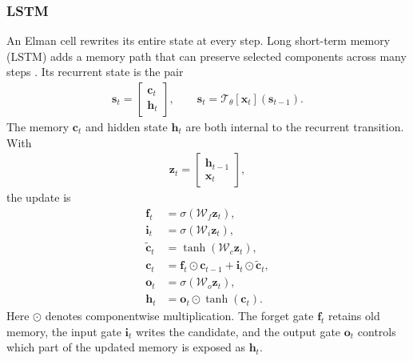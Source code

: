 \documentclass[11pt]{article}
\begin{document}
\subsubsection{LSTM}
An Elman cell rewrites its entire state at every step.  Long short-term memory
(LSTM) adds a memory path that can preserve selected components across many
steps \citep{hochreiter1997lstm}.  Its recurrent state is the pair
\begin{equation}
  \begin{split}
  \bm{s}_t=
  \begin{bmatrix}
    \bm{c}_t\\
    \bm{h}_t
  \end{bmatrix},
  \qquad
  \bm{s}_t
  =\mathcal T_\theta[\bm{x}_t](\bm{s}_{t-1}).
  \end{split}
\end{equation}
The memory $\bm{c}_t$ and hidden state $\bm{h}_t$ are both internal to the
recurrent transition.  With
\begin{equation}
  \begin{split}
  \bm{z}_t=
  \begin{bmatrix}
    \bm{h}_{t-1}\\
    \bm{x}_t
  \end{bmatrix},
  \end{split}
\end{equation}
the update is
\begin{equation}
  \begin{split}
  \bm{f}_t
    &=\sigma(\mathcal W_f\bm{z}_t),\\
  \bm{i}_t
    &=\sigma(\mathcal W_i\bm{z}_t),\\
  \widetilde{\bm{c}}_t
    &=\tanh(\mathcal W_c\bm{z}_t),\\
  \bm{c}_t
    &=\bm{f}_t\odot\bm{c}_{t-1}
      +\bm{i}_t\odot\widetilde{\bm{c}}_t,\\
  \bm{o}_t
    &=\sigma(\mathcal W_o\bm{z}_t),\\
  \bm{h}_t
    &=\bm{o}_t\odot\tanh(\bm{c}_t).
  \label{eq:lstm-cell}
  \end{split}
\end{equation}
Here $\odot$ denotes componentwise multiplication.  The forget gate
$\bm f_t$ retains old memory, the input gate $\bm i_t$ writes the candidate,
and the output gate $\bm o_t$ controls which part of the updated memory is
exposed as $\bm h_t$.
\end{document}
